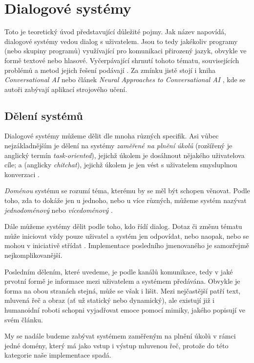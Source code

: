
\chapter{Dialogové systémy}

Toto je teoretický úvod představující důležité pojmy.
Jak název napovídá, dialogové systémy vedou dialog s uživatelem. Jsou to
tedy jakékoliv programy (nebo skupiny programů) využívající
pro komunikaci přirozený jazyk, obvykle ve formě textové nebo hlasové.
Vyčerpávající shrnutí tohoto tématu, souvisejících problémů a metod
jejich řešení podávají \citet{jurafsky_slp_2020}. Za zmínku jistě stojí
i kniha \textit{Conversational AI} \citep{mctear_conversational_2020} nebo
článek \textit{Neural Approaches to Conversational AI} \citep{gao_neural_2019},
kde se autoři zabývají aplikací strojového učení.

\section{Dělení systémů}
Dialogové systémy můžeme dělit dle mnoha různých specifik. Asi vůbec
nejzákladnějším je dělení na systémy \textit{zaměřené na plnění úkolů}
(rozšířený je anglický termín \textit{task-oriented}), jejichž úkolem
je dosáhnout nějakého uživatelova cíle; a  (anglicky
\textit{chitchat}), jejichž úkolem je jen vést s uživatelem smysluplnou
konverzaci \citep[strana 6]{gao_neural_2019}.

\textit{Doménou} systému se rozumí téma, kterému by se měl být schopen
věnovat. Podle toho, zda to dokáže jen u jednoho, nebo u více různých,
můžeme systém nazývat \textit{jednodoménový} nebo \textit{vícedoménový} \citep[strana 47]{gao_neural_2019}.

Dále můžeme systémy dělit podle toho, kdo řídí dialog. Dotaz či změnu tématu
může iniciovat vždy pouze uživatel a systém jen odpovídat, nebo naopak, nebo
se mohou v iniciativě střídat \citep[strany 495-496]{jurafsky_slp_2020}. Implementace posledního jmenovaného je samozřejmě
nejkomplikovanější.

Posledním dělením, které uvedeme, je podle kanálů komunikace, tedy
v jaké prvotní formě je informace mezi uživatelem a systémem předávána.
Obvykle je forma na obou stranách stejná, může se však i lišit. Mezi
nejčastější patří text, mluvená řeč a obraz (ať už statický nebo
dynamický), ale existují již i humanoidní roboti schopni vyjadřovat emoce pomocí
mimiky, jakého popisují \citet{faraj_facially_2021} ve svém článku.

My se nadále budeme zabývat systémem zaměřeným na plnění úkolů v rámci jedné
domény, který má jako vstup i výstup mluvenou řeč, protože do této kategorie
naše implementace spadá.

